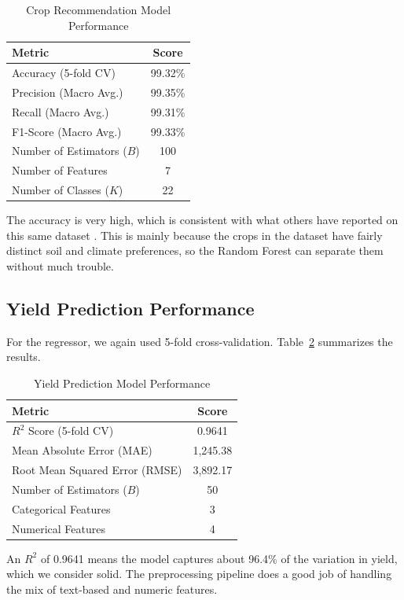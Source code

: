 \documentclass[conference]{IEEEtran}
\begin{document}
\begin{table}[htbp]
\caption{Crop Recommendation Model Performance}
\label{tab:classification_results}
\centering
\begin{tabular}{@{}lc@{}}
\toprule
\textbf{Metric} & \textbf{Score} \\
\midrule
Accuracy (5-fold CV) & 99.32\% \\
Precision (Macro Avg.) & 99.35\% \\
Recall (Macro Avg.) & 99.31\% \\
F1-Score (Macro Avg.) & 99.33\% \\
Number of Estimators ($B$) & 100 \\
Number of Features & 7 \\
Number of Classes ($K$) & 22 \\
\bottomrule
\end{tabular}
\end{table}

The accuracy is very high, which is consistent with what others have reported on this same dataset \cite{pudumalar2017}. This is mainly because the crops in the dataset have fairly distinct soil and climate preferences, so the Random Forest can separate them without much trouble.

\subsection{Yield Prediction Performance}
For the regressor, we again used 5-fold cross-validation. Table~\ref{tab:regression_results} summarizes the results.

\begin{table}[htbp]
\caption{Yield Prediction Model Performance}
\label{tab:regression_results}
\centering
\begin{tabular}{@{}lc@{}}
\toprule
\textbf{Metric} & \textbf{Score} \\
\midrule
$R^2$ Score (5-fold CV) & 0.9641 \\
Mean Absolute Error (MAE) & 1,245.38 \\
Root Mean Squared Error (RMSE) & 3,892.17 \\
Number of Estimators ($B$) & 50 \\
Categorical Features & 3 \\
Numerical Features & 4 \\
\bottomrule
\end{tabular}
\end{table}

An $R^2$ of 0.9641 means the model captures about 96.4\% of the variation in yield, which we consider solid. The preprocessing pipeline does a good job of handling the mix of text-based and numeric features.
\end{document}

